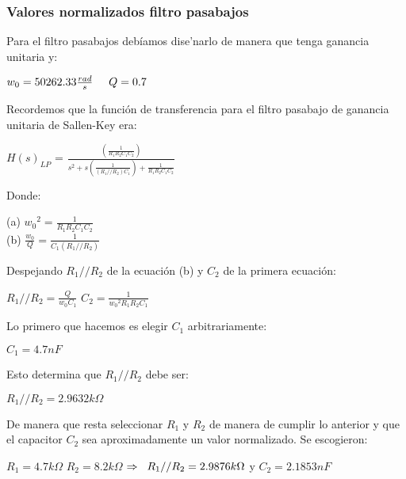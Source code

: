 \documentclass[12pt, titlepage]{article}
\begin{document}
    \subsubsection{Valores normalizados filtro pasabajos}
    Para el filtro pasabajos debíamos dise'narlo de manera que tenga ganancia unitaria y:
    \begin{center}
        $w_0 = 50262.33\frac{rad}{s} \hspace{5mm} Q = 0.7$
    \end{center}
    Recordemos que la función de transferencia para el filtro pasabajo de ganancia unitaria de Sallen-Key era: 
    \begin{center}
        $H(s)_{LP}$ = $\frac{(\frac{1}{R_1R_2C_1C_2})}{s^2 + s(\frac{1}{(R_1//R_2)C_1})+ \frac{1}{ R_1R_2C_1C_2}}$
    \end{center}
    Donde:\begin{center}
        (a) ${w_0}^2 = \frac{1}{R_1R_2C_1C_2}$\\
      (b) $\frac{w_0}{Q} = \frac{1}{C_1(R_1//R_2)}$
    \end{center}
     
     Despejando $R_1//R_2$ de la ecuación (b) y $C_2$ de la primera ecuación:
     \begin{center}
         $R_1//R_2 = \frac{Q}{w_0C_1}$
         $C_2=\frac{1}{{w_0}^2 R_1  R_2  C_1}$
     \end{center}
     
     Lo primero que hacemos es elegir $C_1$ arbitrariamente:
     
    \begin{center}
        $C_1 = 4.7nF$
    \end{center}
    
    Esto determina que $R_1//R_2$ debe ser: 
    
    \begin{center}
             $R_1//R_2 = 2.9632k\Omega$
    \end{center}
   
   De manera que resta seleccionar $R_1$ y $R_2$ de manera de cumplir lo anterior y que el capacitor $C_2$ sea aproximadamente un valor normalizado. Se escogieron:
\begin{center}
    $R_1 = 4.7k\Omega$ \hspace{5mm} $R_2 = 8.2k\Omega$ \hspace{2mm}$\Rightarrow \hspace{2mm}  R_1//R_2 = 2.9876k\Omega$ y $C_2 = 2.1853nF$
\end{center}
\end{document}
